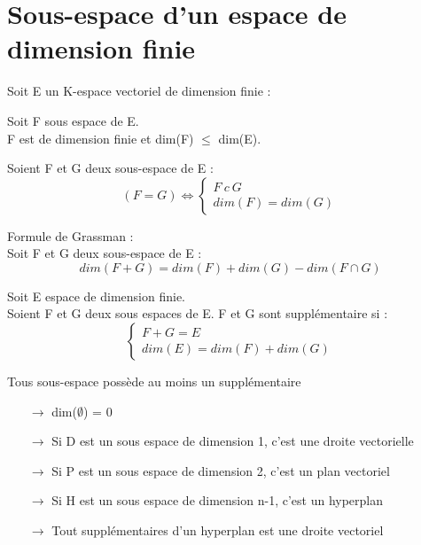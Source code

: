 \section{Sous-espace d'un espace de dimension finie}
Soit E un K-espace vectoriel de dimension finie :
\begin{prop}
Soit F sous espace de E. \\
F est de dimension finie et dim(F) $\leq$ dim(E).
\end{prop}
\begin{prop}
Soient F et G deux sous-espace de E :
$$(F = G) \Leftrightarrow \left\{\begin{array}{l}
   F~ c~ G\\
   dim(F) = dim(G)
  \end{array}\right.$$
\end{prop}

\begin{prop}
Formule de Grassman : \\
Soit F et G deux sous-espace de E :
$$dim(F+G) = dim(F) + dim(G) - dim(F\cap G)$$
\end{prop}
\begin{prop}
 Soit E espace de dimension finie.\\
Soient F et G deux sous espaces de E. F et G sont supplémentaire si :
$$\left\{\begin{array}{l}
   F+G = E \\
   dim(E) = dim(F) + dim(G)
  \end{array}\right.$$
\end{prop}
\begin{prop}
Tous sous-espace possède au moins un supplémentaire
\end{prop}
\begin{prop}
\begin{itemize}
 \item[$\rightarrow$]dim($\emptyset$) = 0
 \item[$\rightarrow$]Si D est un sous espace de dimension 1, c'est une droite vectorielle
 \item[$\rightarrow$]Si P est un sous espace de dimension 2, c'est un plan vectoriel
 \item[$\rightarrow$]Si H est un sous espace de dimension n-1, c'est un hyperplan
 \item[$\rightarrow$]Tout supplémentaires d'un hyperplan est une droite vectoriel
\end{itemize}
\end{prop}
